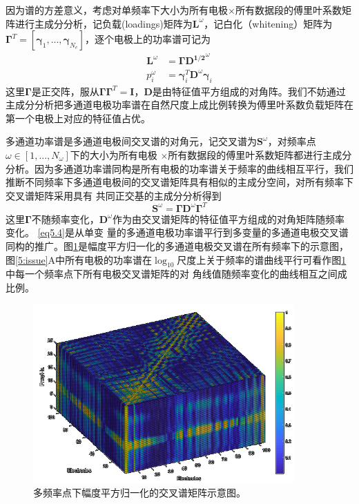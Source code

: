 因为谱的方差意义，考虑对单频率下大小为所有电极$\times$所有数据段的傅里叶系数矩阵进行主成分分析，记负载(loadings)矩阵为$\mathbf{L}^\omega$，记白化（whitening）矩阵为$\mathbf{\Gamma}^T=[\mathbf{\gamma}_1,...,\mathbf{\gamma}_{N_e}]$，逐个电极上的功率谱可记为
\begin{equation}\label{eq5.3}
\begin{aligned}
\mathbf{L}^\omega& =\mathbf{\Gamma}\mathbf{D^{1/2}}^\omega\\
p_i^\omega& =\mathbf{\gamma}_i^T\mathbf{D}^\omega\mathbf{\gamma}_i
\end{aligned}
\end{equation}
这里$\mathbf{\Gamma}$是正交阵，服从$\mathbf{\Gamma}\mathbf{\Gamma}^T=\mathbf{I}$，$\mathbf{D}$是由特征值平方组成的对角阵。我们不妨通过主成分分析把多通道电极功率谱在自然尺度上成比例转换为傅里叶系数负载矩阵在第一个电极上对应的特征值占优。

多通道功率谱是多通道电极间交叉谱的对角元，记交叉谱为$\mathbf{S}^\omega$，对频率点$\omega\in[1,...,N_\omega]$下的大小为所有电极
$\times$所有数据段的傅里叶系数矩阵都进行主成分分析。因为多通道功率谱同构是所有电极的功率谱关于频率的曲线相互平行，我们推断不同频率下多通道电极间的交叉谱矩阵具有相似的主成分空间，对所有频率下交叉谱矩阵采用具有
共同正交基的主成分分析得到
\begin{equation}\label{eq5.4}
\mathbf{S}^\omega=\mathbf{\Gamma}\mathbf{D}^\omega\mathbf{\Gamma}^T
\end{equation}
这里$\mathbf{\Gamma}$不随频率变化，$\mathbf{D}^\omega$作为由交叉谱矩阵的特征值平方组成的对角矩阵随频率变化。 \eqref{eq5.4}是从单变
量的多通道电极功率谱平行到多变量的多通道电极交叉谱同构的推广。图\ref{5:tensor}是幅度平方归一化的多通道电极交叉谱在所有频率下的示意图，
图\ref{5:issue}A中所有电极的功率谱在$\log_{10}$尺度上关于频率的谱曲线平行可看作图\ref{5:tensor}中每一个频率点下所有电极交叉谱矩阵的对
角线值随频率变化的曲线相互之间成比例。
\begin{figure}[!h]
\includegraphics[width=10cm]{pic/palos/spectratensor.png}
\caption{多频率点下幅度平方归一化的交叉谱矩阵示意图。}
\label{5:tensor}
\end{figure}

